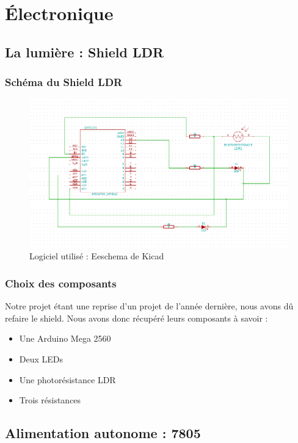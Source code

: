\chapter{Électronique}
\minitoc

\section{La lumière : Shield LDR}
\subsection{Schéma du Shield LDR}
\begin{figure}[h]
	\centering
	\includegraphics[width=550px]{images/SchemaElectriqueShield.png}
	\caption{Logiciel utilisé : Eeschema de Kicad}
\end{figure}

\subsection{Choix des composants} 
	Notre projet étant une reprise d'un projet de l'année dernière, nous avons dû refaire le shield. Nous avons donc récupéré leurs composants à savoir :
	\begin{itemize}
		\item Une Arduino Mega 2560
		\item Deux LEDs 
		\item Une photorésistance LDR
		\item Trois résistances
	\end{itemize}

\section{Alimentation autonome : 7805}
